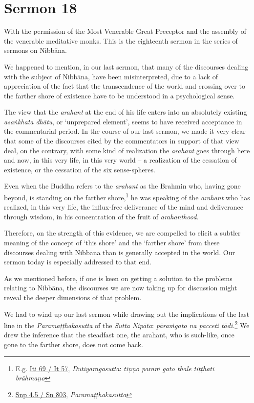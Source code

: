 \chapter{Sermon 18}

\NibbanaOpeningQuote

With the permission of the Most Venerable Great Preceptor and the assembly of the venerable meditative monks. This is the eighteenth sermon in the series of sermons on Nibbāna.

We happened to mention, in our last sermon, that many of the discourses dealing with the subject of Nibbāna, have been misinterpreted, due to a lack of appreciation of the fact that the transcendence of the world and crossing over to the farther shore of existence have to be understood in a psychological sense.

The view that the \emph{arahant} at the end of his life enters into an absolutely existing \emph{asaṅkhata dhātu}, or `unprepared element', seems to have received acceptance in the commentarial period. In the course of our last sermon, we made it very clear that some of the discourses cited by the commentators in support of that view deal, on the contrary, with some kind of realization the \emph{arahant} goes through here and now, in this very life, in this very world -- a realization of the cessation of existence, or the cessation of the six sense-spheres.

Even when the Buddha refers to the \emph{arahant} as the Brahmin who, having gone beyond, is standing on the farther shore,\footnote{E.g. \href{https://suttacentral.net/iti69/pli/ms}{Iti 69 / It 57}, \emph{Dutiyarāgasutta}: \emph{tiṇṇo pāraṁ gato thale tiṭṭhati brāhmaṇo}} he was speaking of the \emph{arahant} who has realized, in this very life, the influx-free deliverance of the mind and deliverance through wisdom, in his concentration of the fruit of \emph{arahanthood}.

Therefore, on the strength of this evidence, we are compelled to elicit a subtler meaning of the concept of `this shore' and the `farther shore' from these discourses dealing with Nibbāna than is generally accepted in the world. Our sermon today is especially addressed to that end.

As we mentioned before, if one is keen on getting a solution to the problems relating to Nibbāna, the discourses we are now taking up for discussion might reveal the deeper dimensions of that problem.

We had to wind up our last sermon while drawing out the implications of the last line in the \emph{Paramaṭṭhakasutta} of the \emph{Sutta Nipāta}: \emph{pāraṁgato na pacceti tādi.}\footnote{\href{https://suttacentral.net/snp4.5/pli/ms}{Snp 4.5 / Sn 803}, \emph{Paramaṭṭhakasutta}} We drew the inference that the steadfast one, the arahant, who is such-like, once gone to the farther shore, does not come back.

